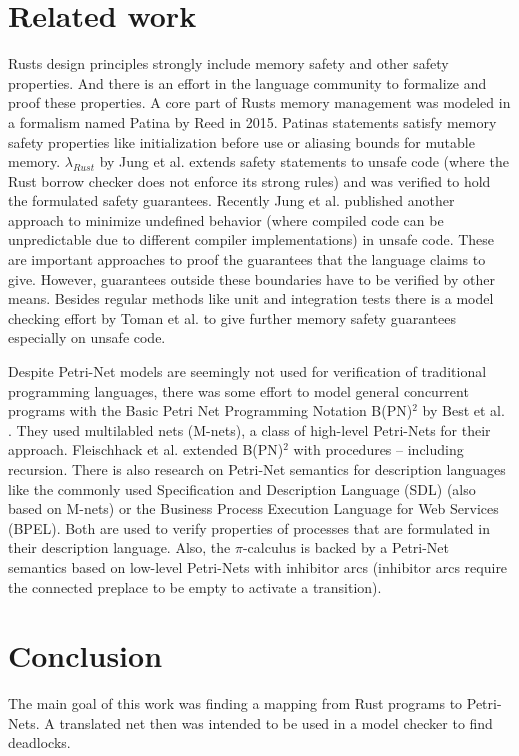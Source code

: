 \chapter{Related work}
Rusts design principles strongly include memory safety and other safety properties.
And there is an effort in the language community to formalize and proof these properties.
A core part of Rusts memory management was modeled in a formalism named Patina by Reed\cite{reed2015patina} in 2015.
Patinas statements satisfy memory safety properties like initialization before use or aliasing bounds for mutable memory.
$\lambda_{Rust}$ by Jung et al.\cite{Jung:2017:RSF:3177123.3158154} extends safety statements to unsafe code (where the Rust borrow checker does not enforce its strong rules) and was verified to hold the formulated safety guarantees.
Recently Jung et al. published another approach to minimize undefined behavior (where compiled code can be unpredictable due to different compiler implementations) in unsafe code.
These are important approaches to proof the guarantees that the language claims to give.
However, guarantees outside these boundaries have to be verified by other means.
Besides regular methods like unit and integration tests there is a model checking effort by Toman et al. \cite{toman2015crust} to give further memory safety guarantees especially on unsafe code.

Despite Petri-Net models are seemingly not used for verification of traditional programming languages, there was some effort to model general concurrent programs with the Basic Petri Net Programming Notation B(PN)$^2$ by Best et al. \cite{Best1993BPN2A}.
They used multilabled nets (M-nets)\cite{best1995class}, a class of high-level Petri-Nets for their approach.
Fleischhack et al. extended B(PN)$^2$ with procedures -- including recursion\cite{fleischhack1997petri}.
There is also research on Petri-Net semantics for description languages like the commonly used Specification and Description Language (SDL)\cite{fleischhack1998compositional} (also based on M-nets) or the Business Process Execution Language for Web Services (BPEL)\cite{stahl2005petri}\cite{lohmann2007feature}.
Both are used to verify properties of processes that are formulated in their description language.
Also, the $\pi$-calculus is backed by a Petri-Net semantics\cite{busi1995petri} based on low-level Petri-Nets with inhibitor arcs (inhibitor arcs require the connected preplace to be empty to activate a transition).

\chapter{Conclusion}
\label{conclusion}
The main goal of this work was finding a mapping from Rust programs to Petri-Nets.
A translated net then was intended to be used in a model checker to find deadlocks.

